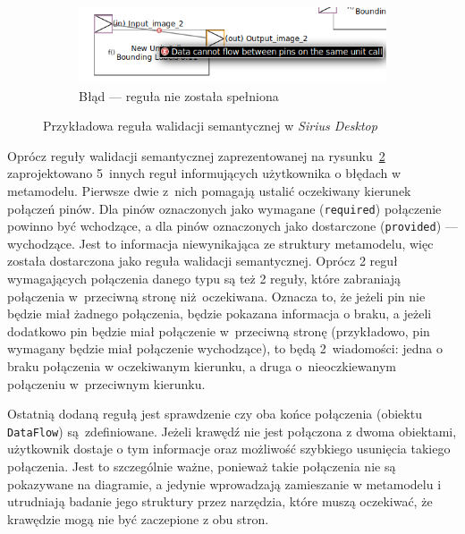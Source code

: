 \begin{figure}[!hb]
  \begin{subfigure}{.92\textwidth}
    \centering
    \includegraphics[width=.99\linewidth]{./images/sirius-desktop-example-semantic-validation-rule-failure.png}
    \caption{Błąd --- reguła nie została
    spełniona}\label{rys:sirius-desktop-example-semantic-validation-rule-failure}
  \end{subfigure}

	\caption{Przykładowa reguła walidacji semantycznej w \emph{Sirius
    Desktop}}\label{rys:sirius-desktop-example-semantic-validation-rule}
  \medskip
\end{figure}

Oprócz reguły walidacji semantycznej zaprezentowanej na
rysunku~\ref{rys:sirius-desktop-example-semantic-validation-rule}
zaprojektowano 5~innych reguł informujących użytkownika o błędach w metamodelu.
Pierwsze dwie z~nich pomagają ustalić oczekiwany kierunek połączeń pinów. Dla
pinów oznaczonych jako wymagane (\texttt{required}) połączenie powinno być
wchodzące, a dla pinów oznaczonych jako dostarczone (\texttt{provided}) ---
wychodzące. Jest to informacja niewynikająca ze struktury metamodelu, więc
została dostarczona jako reguła walidacji semantycznej. Oprócz 2 reguł
wymagających połączenia danego typu są też 2 reguły, które zabraniają
połączenia w~przeciwną stronę niż~oczekiwana. Oznacza to, że jeżeli pin nie
będzie miał żadnego połączenia, będzie pokazana informacja o braku, a jeżeli
dodatkowo pin będzie miał połączenie w~przeciwną stronę (przykładowo, pin
wymagany będzie miał połączenie wychodzące), to będą 2~wiadomości: jedna o
braku połączenia w oczekiwanym kierunku, a druga o~nieoczkiewanym połączeniu
w~przeciwnym kierunku.

Ostatnią dodaną regułą jest sprawdzenie czy oba końce połączenia (obiektu
\texttt{DataFlow}) są~zdefiniowane. Jeżeli krawędź nie jest połączona z dwoma
obiektami, użytkownik dostaje o tym informacje oraz możliwość szybkiego
usunięcia takiego połączenia. Jest to szczególnie ważne, ponieważ takie
połączenia nie są pokazywane na diagramie, a jedynie wprowadzają zamieszanie w
metamodelu i utrudniają badanie jego struktury przez narzędzia, które muszą
oczekiwać, że krawędzie mogą nie być zaczepione z obu stron.

